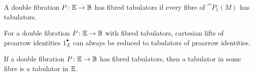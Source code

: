 \documentclass[9pt, leqno]{amsart}
\begin{document}
\begin{defn}
	A double fibration $P \colon \mathbb{E} \to \mathbb{B}$ has fibred tabulators if every fibre of $\cat{P}_1(M)$ has tabulators.
\end{defn}

\begin{prop}\label{cartabu}
	For a double fibration $P \colon \mathbb{E} \to \mathbb{B}$ with fibred tabulators, cartesian lifts of proarrow identities $1^{\bullet}_X$ can always be reduced to tabulators of proarrow identities.
\end{prop}

\begin{lemma}\label{fibred tabulators}
	If a double fibration $P \colon \mathbb{E} \to \mathbb{B}$ has fibred tabulators, then a tabulator in some fibre is a tabulator in $\mathbb{E}$.
\end{lemma}
\end{document}
